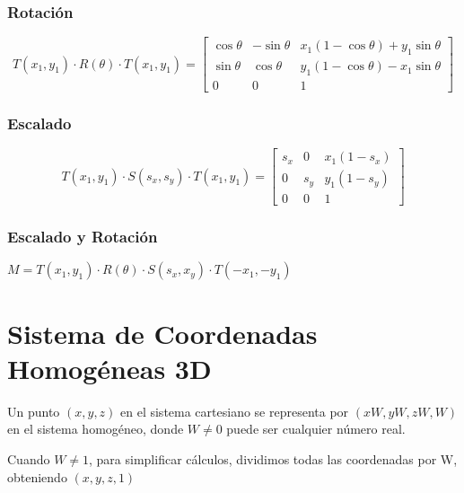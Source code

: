 \subsubsection{Rotación}
$$T(x_1, y_1)\cdot R(\theta) \cdot T(x_1, y_1) =
	\left[\begin{matrix}
			\cos \theta & - \sin \theta & x_1(1-\cos \theta)+y_1 \sin \theta \\ \sin \theta & \cos \theta & y_1(1-\cos \theta)-x_1 \sin \theta \\ 0 & 0 & 1
		\end{matrix}\right]$$

\subsubsection{Escalado}
$$T(x_1, y_1)\cdot S(s_x, s_y) \cdot T(x_1, y_1) =
	\left[\begin{matrix}
			s_x & 0 & x_1(1-s_x) \\ 0 & s_y & y_1(1-s_y) \\ 0 & 0 & 1
		\end{matrix}\right]$$

\subsubsection{Escalado y Rotación}
$M=T(x_1, y_1) \cdot R(\theta) \cdot S(s_x, x_y) \cdot T(-x_1, -y_1)$

\section{Sistema de Coordenadas Homogéneas 3D}
Un punto $(x, y, z)$ en el sistema cartesiano se representa por $( xW , yW , zW, W )$ en el sistema homogéneo, donde $W\neq 0$ puede ser cualquier número real.

Cuando $W\neq 1$, para simplificar cálculos, dividimos todas las coordenadas por W, obteniendo $( x , y , z, 1 )$

